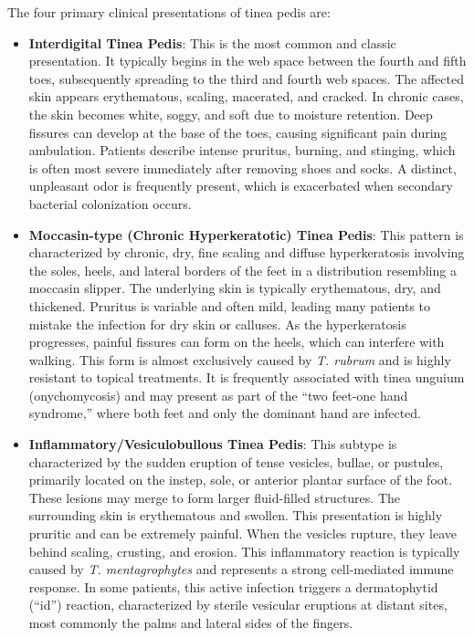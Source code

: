 The four primary clinical presentations of tinea pedis are:
\begin{itemize}
    \item \textbf{Interdigital Tinea Pedis}: This is the most common and classic presentation. It typically begins in the web space between the fourth and fifth toes, subsequently spreading to the third and fourth web spaces. The affected skin appears erythematous, scaling, macerated, and cracked. In chronic cases, the skin becomes white, soggy, and soft due to moisture retention. Deep fissures can develop at the base of the toes, causing significant pain during ambulation. Patients describe intense pruritus, burning, and stinging, which is often most severe immediately after removing shoes and socks. A distinct, unpleasant odor is frequently present, which is exacerbated when secondary bacterial colonization occurs.
    \item \textbf{Moccasin-type (Chronic Hyperkeratotic) Tinea Pedis}: This pattern is characterized by chronic, dry, fine scaling and diffuse hyperkeratosis involving the soles, heels, and lateral borders of the feet in a distribution resembling a moccasin slipper. The underlying skin is typically erythematous, dry, and thickened. Pruritus is variable and often mild, leading many patients to mistake the infection for dry skin or calluses. As the hyperkeratosis progresses, painful fissures can form on the heels, which can interfere with walking. This form is almost exclusively caused by \textit{T. rubrum} and is highly resistant to topical treatments. It is frequently associated with tinea unguium (onychomycosis) and may present as part of the ``two feet-one hand syndrome,'' where both feet and only the dominant hand are infected.
    \item \textbf{Inflammatory/Vesiculobullous Tinea Pedis}: This subtype is characterized by the sudden eruption of tense vesicles, bullae, or pustules, primarily located on the instep, sole, or anterior plantar surface of the foot. These lesions may merge to form larger fluid-filled structures. The surrounding skin is erythematous and swollen. This presentation is highly pruritic and can be extremely painful. When the vesicles rupture, they leave behind scaling, crusting, and erosion. This inflammatory reaction is typically caused by \textit{T. mentagrophytes} and represents a strong cell-mediated immune response. In some patients, this active infection triggers a dermatophytid (``id'') reaction, characterized by sterile vesicular eruptions at distant sites, most commonly the palms and lateral sides of the fingers.

\end{itemize}
